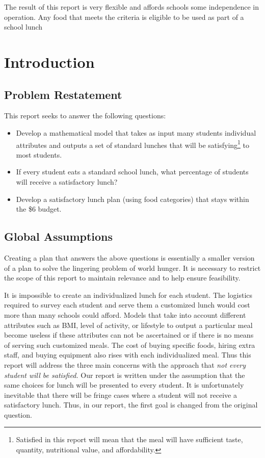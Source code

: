 \documentclass[letterpaper,oneside,12pt]{report}
\begin{document}
The result of this report is very flexible and affords schools some independence in operation. Any food that meets the criteria is eligible to be used as part of a school lunch

\chapter{Introduction}\label{Introduction}
\section{Problem Restatement}\label{Problem Restatement}
This report seeks to answer the following questions: 
\begin{itemize}
	\item Develop a mathematical model that takes as input many students individual attributes and outputs a set of standard lunches that will be satisfying\footnote{Satisfied in this report will mean that the meal will have sufficient taste, quantity, nutritional value, and affordability.} to most students. 
	\item  If every student eats a standard school lunch, what percentage of students will receive a satisfactory lunch?
	\item Develop a satisfactory lunch plan (using food categories) that stays within the \$6 budget.
\end{itemize}

\section{Global Assumptions}\label{Global Assumptions}
Creating a plan that answers the above questions is essentially a smaller version of a plan to solve the lingering problem of world hunger. It is necessary to restrict the scope of this report to maintain relevance and to help ensure feasibility.

It is impossible to create an individualized lunch for each student. The logistics required to survey each student and serve them a customized lunch would cost more than many schools could afford.  Models that take into account different attributes such as BMI, level of activity, or lifestyle to output a particular meal become useless if these attributes can not be ascertained or if there is no means of serving such customized meals. The cost of buying specific foods, hiring extra staff, and buying equipment also rises with each individualized meal. Thus this report will address the three main concerns with the approach that\textsl{ not every student will be satisfied.} Our report is written under the assumption that the same choices for lunch will be presented to every student. It is unfortunately inevitable that there will be fringe cases where a student will not receive a satisfactory lunch. Thus, in our report,  the first goal is changed from the original question. 
\end{document}
